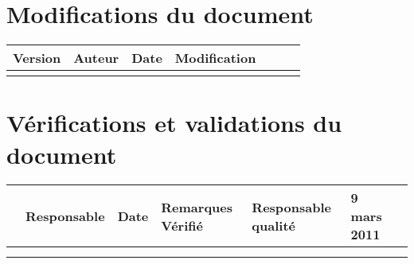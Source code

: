 
\section*{Modifications du document}

\begin{center}
\begin{longtable}{|m{14mm}|m{36mm}|m{36mm}|m{60mm}|}
\hline
Version & Auteur & Date & Modification\endhead \hline

& %

& %

& %

\\\hline

& %

& %

& %

\\\hline
\end{longtable}
\end{center}


\section*{Vérifications et validations du document}

\begin{center}
\begin{longtable}{|m{15mm}|m{36mm}|m{36mm}|m{60mm}|}
\hline
 & Responsable & Date & Remarques\endhead \hline
Vérifié
& %
Responsable qualité
& %
9 mars 2011
& %
\\\hline
& %
& %
& %
\\\hline
& %
& %
& %
\\\hline
\end{longtable}
\end{center}

\pagebreak
